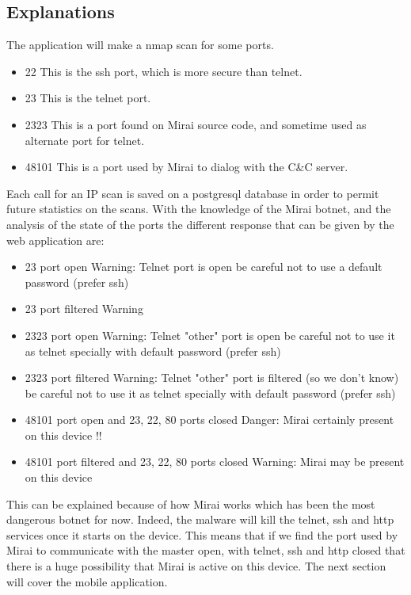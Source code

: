 \documentclass{report}
\begin{document}
\subsection{Explanations}
The application will make a nmap scan for some ports.
\begin{itemize}
 \item 22 This is the ssh port, which is more secure than telnet.
 \item 23 This is the telnet port.
 \item 2323 This is a port found on Mirai source code, and sometime used as alternate port for telnet.
 \item 48101 This is a port used by Mirai to dialog with the C\&C server.
\end{itemize}
Each call for an IP scan is saved on a postgresql database in order to permit future statistics on the scans. With the knowledge of the Mirai botnet, and the analysis of the state of the ports the different response that can be given by the web application are:
\begin{itemize}
\item 23 port open\newline
  Warning: Telnet port is open be careful not to use a default password (prefer ssh)
\item 23 port filtered\newline
  Warning
\item 2323 port open\newline
  Warning: Telnet "other" port is open be careful not to use it as telnet specially with default password (prefer ssh)
\item 2323 port filtered\newline
  Warning: Telnet "other" port is filtered (so we don't know) be careful not to use it as telnet specially with default password (prefer ssh)
\item 48101 port open and 23, 22, 80 ports closed\newline
  Danger: Mirai certainly present on this device !!
\item 48101 port filtered and 23, 22, 80 ports closed\newline
  Warning: Mirai may be present on this device
\end{itemize}
This can be explained because of how Mirai works which has been the most dangerous botnet for now. Indeed, the malware will kill the telnet, ssh and http services once it starts on the device. This means that if we find the port used by Mirai to communicate with the master open,  with telnet, ssh and http closed that there is a huge possibility that Mirai is active on this device.\newline
The next section will cover the mobile application.
\end{document}
